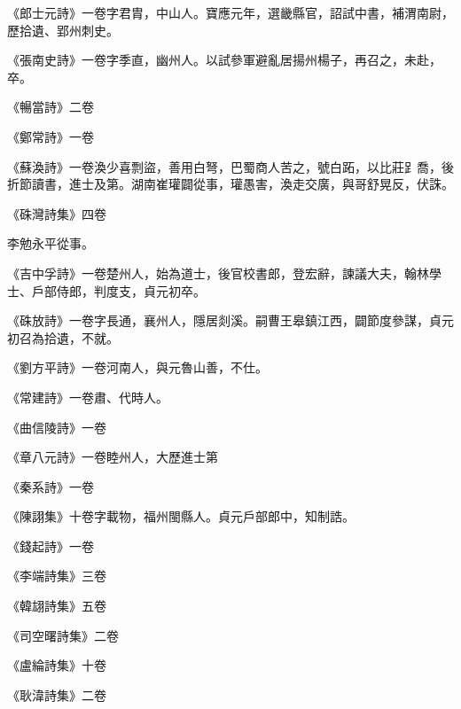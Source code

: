 \begin{pinyinscope}
 《郎士元詩》一卷字君胄，中山人。寶應元年，選畿縣官，詔試中書，補渭南尉，歷拾遺、郢州刺史。



 《張南史詩》一卷字季直，幽州人。以試參軍避亂居揚州楊子，再召之，未赴，卒。



 《暢當詩》二卷



 《鄭常詩》一卷



 《蘇渙詩》一卷渙少喜剽盜，善用白弩，巴蜀商人苦之，號白跖，以比莊𧾷喬，後折節讀書，進士及第。湖南崔瓘闢從事，瓘愚害，渙走交廣，與哥舒晃反，伏誅。



 《硃灣詩集》四卷



 李勉永平從事。



 《吉中孚詩》一卷楚州人，始為道士，後官校書郎，登宏辭，諫議大夫，翰林學士、戶部侍郎，判度支，貞元初卒。



 《硃放詩》一卷字長通，襄州人，隱居剡溪。嗣曹王皋鎮江西，闢節度參謀，貞元初召為拾遺，不就。



 《劉方平詩》一卷河南人，與元魯山善，不仕。



 《常建詩》一卷肅、代時人。



 《曲信陵詩》一卷



 《章八元詩》一卷睦州人，大歷進士第



 《秦系詩》一卷



 《陳詡集》十卷字載物，福州閩縣人。貞元戶部郎中，知制誥。



 《錢起詩》一卷



 《李端詩集》三卷



 《韓翃詩集》五卷



 《司空曙詩集》二卷



 《盧綸詩集》十卷



 《耿湋詩集》二卷




\end{pinyinscope}
